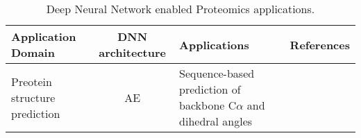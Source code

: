 \begin{table}[h!]
\centering
\begin{tabular}{|| l | c | l | l ||}
    \hline
    Application Domain & DNN architecture & Applications & References\\
    \hline \hline
    Preotein structure prediction & AE & Sequence-based prediction of backbone C$\alpha$ and dihedral angles & \\
    \hline
\end{tabular}
\caption{Deep Neural Network enabled Proteomics applications.}
\label{tab:PS-DNN}
\end{table}